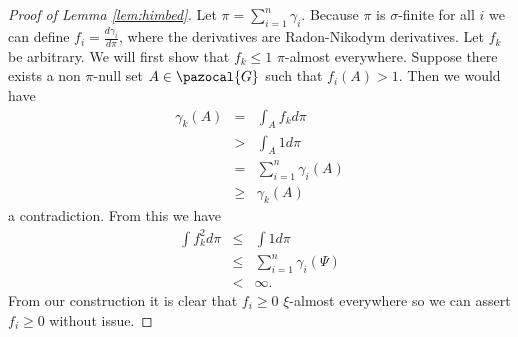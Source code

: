 \documentclass[aos]{imsart}
\def\sG{\pazocal{G}}
\theoremstyle{plain}
\theoremstyle{defintion}
\begin{document}
	\begin{proof}[Proof of Lemma \ref{lem:himbed}]
		Let $\pi= \sum_{i=1}^n \gamma_i$. Because $\pi$ is $\sigma$-finite for all $i$ we can define $f_i = \frac{d\gamma_i}{d\pi}$, where the derivatives are Radon-Nikodym derivatives. Let $f_k$ be arbitrary. We will first show that $f_k\le1$ $\pi$-almost everywhere. Suppose there exists a non $\pi$-null set $A \in \sG$ such that $f_i(A) >1$. Then we would have
		\begin{eqnarray*}
			\gamma_k\left( A \right)
			&=& \int_A f_k d\pi	\\
		 &>& \int_A 1 d\pi\\
		 &=& \sum_{i=1}^n \gamma_i(A)\\
		 &\ge& \gamma_k(A)
		\end{eqnarray*}
		a contradiction. From this we have
		\begin{eqnarray*}
			\int f_k^2 d\pi
			&\le& \int 1 d\pi\\
		 &\le& \sum_{i=1}^n \gamma_i(\Psi)\\
		 &<& \infty.
		\end{eqnarray*}
		From our construction it is clear that $f_i \ge 0$ $\xi$-almost everywhere so we can assert $f_i \ge 0$ without issue.
	\end{proof}
\end{document}

